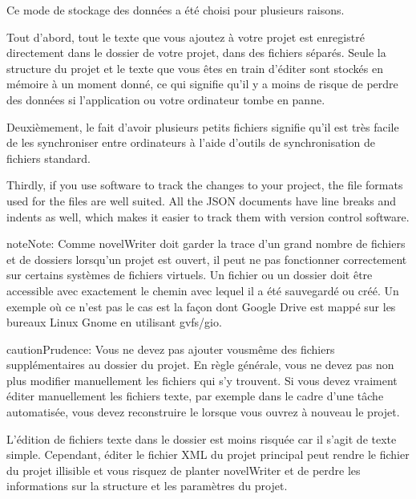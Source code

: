 \documentclass[a4paper,11pt,french]{sphinxmanual}
\begin{document}
\sphinxAtStartPar
Ce mode de stockage des données a été choisi pour plusieurs raisons.

\sphinxAtStartPar
Tout d’abord, tout le texte que vous ajoutez à votre projet est enregistré directement dans le dossier de votre projet, dans des fichiers séparés. Seule la structure du projet et le texte que vous êtes en train d’éditer sont stockés en mémoire à un moment donné, ce qui signifie qu’il y a moins de risque de perdre des données si l’application ou votre ordinateur tombe en panne.

\sphinxAtStartPar
Deuxièmement, le fait d’avoir plusieurs petits fichiers signifie qu’il est très facile de les synchroniser entre ordinateurs à l’aide d’outils de synchronisation de fichiers standard.

\sphinxAtStartPar
Thirdly, if you use  software to track the changes to your project, the file
formats used for the files are well suited. All the JSON documents have line breaks and indents as
well, which makes it easier to track them with version control software.

\begin{sphinxadmonition}{note}{Note:}
\sphinxAtStartPar
Comme novelWriter doit garder la trace d’un grand nombre de fichiers et de dossiers lorsqu’un projet est ouvert, il peut ne pas fonctionner correctement sur certains systèmes de fichiers virtuels. Un fichier ou un dossier doit être accessible avec exactement le chemin avec lequel il a été sauvegardé ou créé. Un exemple où ce n’est pas le cas est la façon dont Google Drive est mappé sur les bureaux Linux Gnome en utilisant gvfs/gio.
\end{sphinxadmonition}

\begin{sphinxadmonition}{caution}{Prudence:}
\sphinxAtStartPar
Vous ne devez pas ajouter vous\sphinxhyphen{}même des fichiers supplémentaires au dossier du projet. En règle générale, vous ne devez pas non plus modifier manuellement les fichiers qui s’y trouvent. Si vous devez vraiment éditer manuellement les fichiers texte, par exemple dans le cadre d’une tâche automatisée, vous devez reconstruire le {\hyperref[\detokenize{int_glossary:term-Project-Index}]{}} lorsque vous ouvrez à nouveau le projet.

\sphinxAtStartPar
L’édition de fichiers texte dans le dossier  est moins risquée car il s’agit de texte simple. Cependant, éditer le fichier XML du projet principal peut rendre le fichier du projet illisible et vous risquez de planter novelWriter et de perdre les informations sur la structure et les paramètres du projet.
\end{sphinxadmonition}
\end{document}
